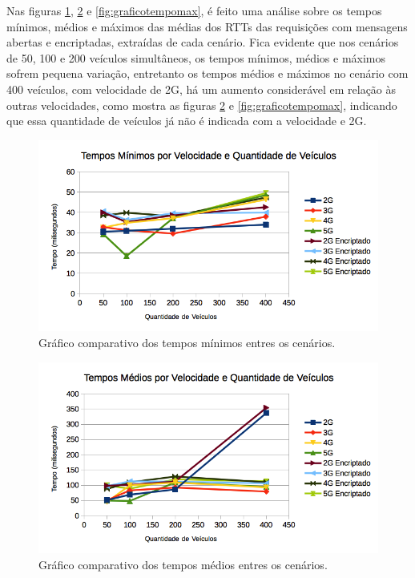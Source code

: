 \documentclass[
	12pt,				%
	oneside,			%
	a4paper,			%
	english,			%
	brazil				%
	]{abntex2ppgsi}
\begin{document}

Nas figuras \ref{fig:graficotempomin},  \ref{fig:graficotempomedio} e  \ref{fig:graficotempomax}, é feito uma análise sobre os tempos mínimos, médios e máximos das médias dos RTTs das requisições com mensagens abertas e encriptadas, extraídas de cada cenário. Fica evidente que nos cenários de 50, 100 e 200 veículos simultâneos, os tempos mínimos, médios e máximos sofrem pequena variação, entretanto os tempos médios e máximos no cenário com 400 veículos, com velocidade de 2G, há um aumento considerável em relação às outras velocidades, como mostra as figuras \ref{fig:graficotempomedio} e  \ref{fig:graficotempomax}, indicando que essa quantidade de veículos já não é indicada com a velocidade e 2G.

\begin{figure}[h!]
	\centering
	\includegraphics[width=0.7\columnwidth]{images/grafico_tempo_min.png}
	\caption{Gráfico comparativo dos tempos mínimos entres os cenários.}
	\label{fig:graficotempomin}
\end{figure}

\begin{figure}[h!]
	\centering
	\includegraphics[width=0.7\columnwidth]{images/grafico_tempo_medio.png}
	\caption{Gráfico comparativo dos tempos médios entres os cenários.}
	\label{fig:graficotempomedio}
\end{figure}
\end{document}
